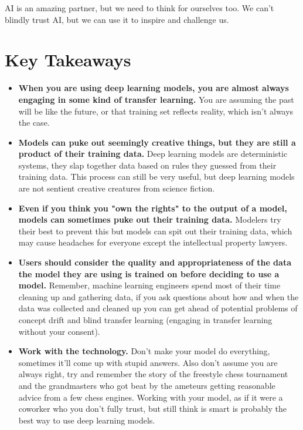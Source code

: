 AI is an amazing partner, but we need to think for ourselves too. We can’t blindly trust AI, but we can use it to inspire and challenge us.

\section{Key Takeaways}

\begin{itemize}
    \item \textbf{When you are using deep learning models, you are almost always engaging in some kind of transfer learning.} You are assuming the past will be like the future, or that training set reflects reality, which isn't always the case. 
    \item \textbf{Models can puke out seemingly creative things, but they are still a product of their training data.} Deep learning models are deterministic systems, they slap together data based on rules they guessed from their training data. This process can still be very useful, but deep learning models are not sentient creative creatures from science fiction.
    \item \textbf{Even if you think you "own the rights" to the output of a model, models can sometimes puke out their training data.} Modelers try their best to prevent this but models can spit out their training data, which may cause headaches for everyone except the intellectual property lawyers. 
    \item \textbf{Users should consider the quality and appropriateness of the data the model they are using is trained on before deciding to use a model.} Remember, machine learning engineers spend most of their time cleaning up and gathering data, if you ask questions about how and when the data was collected and cleaned up you can get ahead of potential problems of concept drift and blind transfer learning (engaging in transfer learning without your consent).
    \item \textbf{Work with the technology.} Don't make your model do everything, sometimes it'll come up with stupid answers. Also don't assume you are always right, try and remember the story of the freestyle chess tournament and the grandmasters who got beat by the ameteurs getting reasonable advice from a few chess engines. Working with your model, as if it were a coworker who you don't fully trust, but still think is smart is probably the best way to use deep learning models.
\end{itemize}

